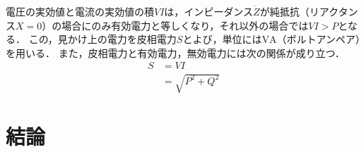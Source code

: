 \documentclass[11pt,dvipdfmx]{ujarticle}
\begin{document}
電圧の実効値と電流の実効値の積$VI$は，インピーダンス$\dot{Z}$が純抵抗（リアクタンス$X=0$）の場合にのみ有効電力と等しくなり，それ以外の場合では$VI> P$となる．
この，見かけ上の電力を皮相電力$S$とよび，単位には$\mathrm{VA}$（ボルトアンペア）を用いる．
また，皮相電力と有効電力，無効電力には次の関係が成り立つ．
\begin{align}
	S &= VI\nonumber\\
	&= \sqrt{P^2+Q^2}
\end{align}




\section{結論}

\newpage
\printbibliography[title=参考文献]
\end{document}
